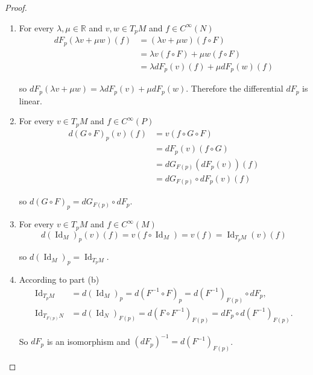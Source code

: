 \begin{proof}
    \begin{enumerate}[label={(\alph*)},itemsep=0pt]
        \item For every \( \lambda, \mu \in \mathbb{R} \) and \( v, w \in T_{p}M \) and \( f \in C^{\infty}(N) \)
              \begingroup
              \allowdisplaybreaks%
              \begin{align*}
                  dF_{p}(\lambda v + \mu w)(f) & = (\lambda v + \mu w)(f \circ F)          \\
                                               & = \lambda v(f \circ F) + \mu w(f \circ F) \\
                                               & = \lambda dF_{p}(v)(f) + \mu dF_{p}(w)(f)
              \end{align*}
              \endgroup

              so \( dF_{p}(\lambda v + \mu w) = \lambda dF_{p}(v) + \mu dF_{p}(w) \). Therefore the differential \( dF_{p} \) is linear.
        \item For every \( v \in T_{p}M \) and \( f \in C^{\infty}(P) \)
              \begingroup
              \allowdisplaybreaks%
              \begin{align*}
                  d{(G \circ F)}_{p}(v)(f) & = v(f \circ G \circ F)         \\
                                           & = dF_{p}(v)(f \circ G)         \\
                                           & = dG_{F(p)}(dF_{p}(v))(f)      \\
                                           & = dG_{F(p)} \circ dF_{p}(v)(f)
              \end{align*}
              \endgroup

              so \( d{(G \circ F)}_{p} = dG_{F(p)} \circ dF_{p} \).
        \item For every \( v \in T_{p}M \) and \( f \in C^{\infty}(M) \)
              \[
                  d{(\operatorname{Id}_{M})}_{p}(v)(f) = v(f \circ \operatorname{Id}_{M}) = v(f) = \operatorname{Id}_{T_{p}M}(v)(f)
              \]

              so \( d{(\operatorname{Id}_{M})}_{p} = \operatorname{Id}_{T_{p}M} \).
        \item According to part (b)
              \begingroup
              \allowdisplaybreaks%
              \begin{align*}
                  \operatorname{Id}_{T_{p}M}    & = d{(\operatorname{Id}_{M})}_{p} = d{(F^{-1} \circ F)}_{p} = d{(F^{-1})}_{F(p)} \circ dF_{p},       \\
                  \operatorname{Id}_{T_{F(p)}N} & = d{(\operatorname{Id}_{N})}_{F(p)} = d{(F \circ F^{-1})}_{F(p)} = dF_{p} \circ d{(F^{-1})}_{F(p)}.
              \end{align*}
              \endgroup

              So \( dF_{p} \) is an isomorphism and \( {(dF_{p})}^{-1} = d{(F^{-1})}_{F(p)} \).
    \end{enumerate}
\end{proof}

